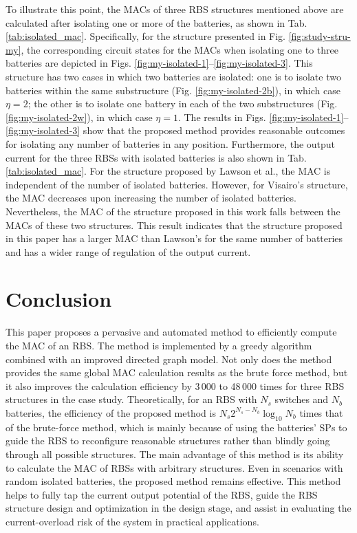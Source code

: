 \documentclass{article}
\begin{document}
To illustrate this point, the MACs of three RBS structures mentioned above are calculated after isolating one or more of the batteries, as shown in Tab. \ref{tab:isolated_mac}. 
Specifically, for the structure presented in Fig. \ref{fig:study-stru-my}, the corresponding circuit states for the MACs when isolating one to three batteries are depicted in Figs. \ref{fig:my-isolated-1}--\ref{fig:my-isolated-3}. 
This structure has two cases in which two batteries are isolated: 
one is to isolate two batteries within the same substructure (Fig. \ref{fig:my-isolated-2b}), in which case $\eta=2$; the other is to isolate one battery in each of the two substructures (Fig. \ref{fig:my-isolated-2w}), in which case $\eta=1$. 
The results in Figs. \ref{fig:my-isolated-1}--\ref{fig:my-isolated-3} show that the proposed method provides reasonable outcomes for isolating any number of batteries in any position.
Furthermore, the output current for the three RBSs with isolated batteries is also shown in Tab. \ref{tab:isolated_mac}. 
For the structure proposed by Lawson et al., the MAC is independent of the number of isolated batteries.
However, for Visairo's structure, the MAC decreases upon increasing the number of isolated batteries. 
Nevertheless, the MAC of the structure proposed in this work falls between the MACs of these two structures. 
This result indicates that the structure proposed in this paper has a larger MAC than Lawson's for the same number of batteries and has a wider range of regulation of the output current. 

\section{Conclusion}

This paper proposes a pervasive and automated method to efficiently compute the MAC of an RBS.
The method is implemented by a greedy algorithm combined with an improved directed graph model.
Not only does the method provides the same global MAC calculation results as the brute force method, but it also improves the calculation efficiency by 3\,000 to 48\,000 times for three RBS structures in the case study.
Theoretically, for an RBS with $N_s$ switches and $N_b$ batteries, the efficiency of the proposed method is $N_s 2^{N_s - N_b} \log_{10} N_b$ times that of the brute-force method, which is mainly because of using the batteries' SPs to guide the RBS to reconfigure reasonable structures rather than blindly going through all possible structures.
The main advantage of this method is its ability to calculate the MAC of RBSs with arbitrary structures.
Even in scenarios with random isolated batteries, the proposed method remains effective.
This method helps to fully tap the current output potential of the RBS, guide the RBS structure design and optimization in the design stage, and assist in evaluating the current-overload risk of the system in practical applications.
\end{document}
